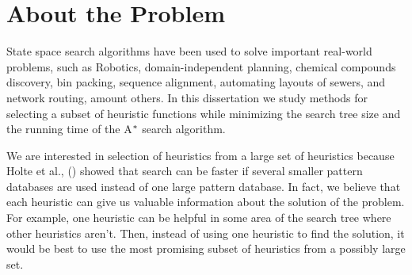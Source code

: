 

\chapter{About the Problem}\label{aboutTheProblem}
\noindent
State space search algorithms have been used to solve important real-world problems, such as Robotics, domain-independent planning, chemical compounds discovery, bin packing, sequence alignment, automating layouts of sewers, and network routing, amount others. In this dissertation we study methods for selecting a subset of heuristic functions while minimizing the search tree size and the running time of the A$\sp{*}$ search algorithm.

We are interested in selection of heuristics from a large set of heuristics because Holte et al., (\citeyear{holte2006maximizing}) showed that search can be faster if several smaller pattern databases are used instead of one large pattern database. In fact, we believe that each heuristic can give us valuable information about the solution of the problem. For example, one heuristic can be helpful in some area of the search tree where other heuristics aren't. Then, instead of using one heuristic to find the solution, it would be best to use the most promising subset of heuristics from a possibly large set.

